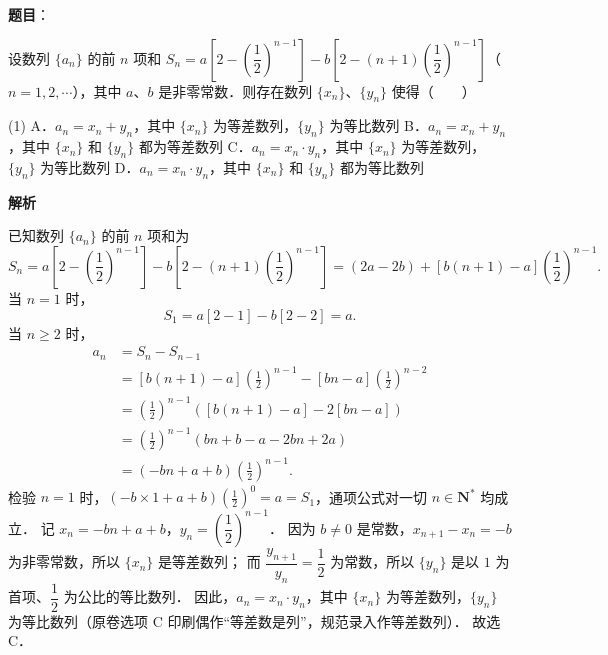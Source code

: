 \begin{answer}

\textbf{题目}：

设数列 $\{a_n\}$ 的前 $n$ 项和 $S_n = a\left[2 - \left(\dfrac{1}{2}\right)^{n-1}\right] - b\left[2 - (n + 1)\left(\dfrac{1}{2}\right)^{n-1}\right]$（$n = 1, 2, \cdots$），其中 $a$、$b$ 是非零常数．则存在数列 $\{x_n\}$、$\{y_n\}$ 使得\mbox{（　　）}

\begin{gkopts}(1)
\task A．$a_n = x_n + y_n$，其中 $\{x_n\}$ 为等差数列，$\{y_n\}$ 为等比数列
\task B．$a_n = x_n + y_n$，其中 $\{x_n\}$ 和 $\{y_n\}$ 都为等差数列
\task C．$a_n = x_n \cdot y_n$，其中 $\{x_n\}$ 为等差数列，$\{y_n\}$ 为等比数列
\task D．$a_n = x_n \cdot y_n$，其中 $\{x_n\}$ 和 $\{y_n\}$ 都为等比数列
\end{gkopts}

\textbf{解析}

已知数列 $\{a_n\}$ 的前 $n$ 项和为
\nopagebreak[4]
\[
S_n = a\left[2 - \left(\frac{1}{2}\right)^{n-1}\right] - b\left[2 - (n + 1)\left(\frac{1}{2}\right)^{n-1}\right] = (2a - 2b) + [b(n + 1) - a]\left(\frac{1}{2}\right)^{n-1}.
\]
当 $n = 1$ 时，
\nopagebreak[4]
\[
S_1 = a[2 - 1] - b[2 - 2] = a.
\]
当 $n \geqslant 2$ 时，
\nopagebreak[4]
\[
\begin{aligned}
a_n &= S_n - S_{n-1} \\
&= [b(n + 1) - a]\left(\frac{1}{2}\right)^{n-1} - [bn - a]\left(\frac{1}{2}\right)^{n-2} \\
&= \left(\frac{1}{2}\right)^{n-1} \left( [b(n + 1) - a] - 2[bn - a] \right) \\
&= \left(\frac{1}{2}\right)^{n-1} (bn + b - a - 2bn + 2a) \\
&= (-bn + a + b)\left(\frac{1}{2}\right)^{n-1}.
\end{aligned}
\]
检验 $n = 1$ 时，$(-b \times 1 + a + b)\left(\frac{1}{2}\right)^0 = a = S_1$，通项公式对一切 $n \in \mathbf{N}^*$ 均成立．
记 $x_n = -bn + a + b$，$y_n = \left(\dfrac{1}{2}\right)^{n-1}$．
因为 $b \neq 0$ 是常数，$x_{n+1} - x_n = -b$ 为非零常数，所以 $\{x_n\}$ 是等差数列；
而 $\dfrac{y_{n+1}}{y_n} = \dfrac{1}{2}$ 为常数，所以 $\{y_n\}$ 是以 $1$ 为首项、$\dfrac{1}{2}$ 为公比的等比数列．
因此，$a_n = x_n \cdot y_n$，其中 $\{x_n\}$ 为等差数列，$\{y_n\}$ 为等比数列（原卷选项 C 印刷偶作“等差数是列”，规范录入作等差数列）．
故选 C．


\end{answer}
